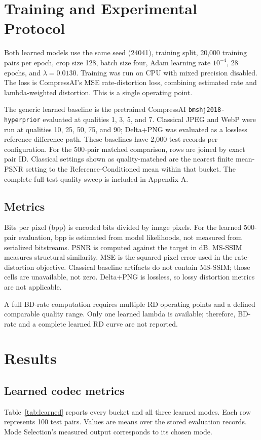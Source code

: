 \documentclass[conference]{IEEEtran}
\begin{document}
\section{Training and Experimental Protocol}
Both learned models use the same seed (24041), training split, 20,000 training pairs per epoch, crop size 128, batch size four, Adam learning rate $10^{-4}$, 28 epochs, and $\lambda=0.0130$. Training was run on CPU with mixed precision disabled. The loss is CompressAI's MSE rate-distortion loss, combining estimated rate and lambda-weighted distortion. This is a single operating point.

The generic learned baseline is the pretrained CompressAI \texttt{bmshj2018-hyperprior} evaluated at qualities 1, 3, 5, and 7. Classical JPEG and WebP were run at qualities 10, 25, 50, 75, and 90; Delta+PNG was evaluated as a lossless reference-difference path. These baselines have 2,000 test records per configuration. For the 500-pair matched comparison, rows are joined by exact pair ID. Classical settings shown as quality-matched are the nearest finite mean-PSNR setting to the Reference-Conditioned mean within that bucket. The complete full-test quality sweep is included in Appendix A.

\subsection{Metrics}
Bits per pixel (bpp) is encoded bits divided by image pixels. For the learned 500-pair evaluation, bpp is estimated from model likelihoods, not measured from serialized bitstreams. PSNR is computed against the target in dB. MS-SSIM measures structural similarity. MSE is the squared pixel error used in the rate-distortion objective. Classical baseline artifacts do not contain MS-SSIM; those cells are unavailable, not zero. Delta+PNG is lossless, so lossy distortion metrics are not applicable.

A full BD-rate computation requires multiple RD operating points and a defined comparable quality range. Only one learned lambda is available; therefore, BD-rate and a complete learned RD curve are not reported.

\section{Results}
\subsection{Learned codec metrics}
Table~\ref{tab:learned} reports every bucket and all three learned modes. Each row represents 100 test pairs. Values are means over the stored evaluation records. Mode Selection's measured output corresponds to its chosen mode.
\end{document}
